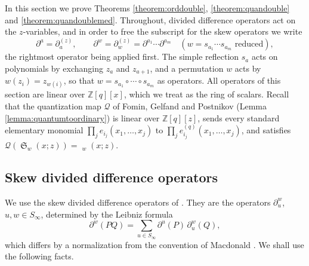 \documentclass{amsart}
\theoremstyle{definition}
\theoremstyle{remark}
\numberwithin{equation}{section}
\DeclareMathOperator{\sch}{\mathfrak{S}}
\DeclareMathOperator{\qsch}{\widetilde{\mathfrak{S}}}
\begin{document}
In this section we prove Theorems \ref{theorem:orddouble}, \ref{theorem:quandouble} and \ref{theorem:quandoublemed}. Throughout, divided difference operators act on the $z$-variables, and in order to free the subscript for the skew operators we write
$$\partial^a=\partial^{(z)}_a,\qquad \partial^w=\partial^{(z)}_w=\partial^{a_1}\cdots\partial^{a_m}\quad(w=s_{a_1}\cdots s_{a_m}\text{ reduced}),$$
the rightmost operator being applied first. The simple reflection $s_a$ acts on polynomials by exchanging $z_a$ and $z_{a+1}$, and a permutation $w$ acts by $w(z_i)=z_{w(i)}$, so that $w=s_{a_1}\circ\cdots\circ s_{a_m}$ as operators. All operators of this section are linear over $\mathbb Z[q][x]$, which we treat as the ring of scalars. Recall that the quantization map $\mathcal Q$ of Fomin, Gelfand and Postnikov (Lemma \ref{lemma:quantumtoordinary}) is linear over $\mathbb Z[q][z]$, sends every standard elementary monomial $\prod_je_{i_j}(x_1,\ldots,x_j)$ to $\prod_je^{(q)}_{i_j}(x_1,\ldots,x_j)$, and satisfies $\mathcal Q(\sch_w(x;z))=\qsch_w(x;z)$.

\subsection{Skew divided difference operators}

We use the skew divided difference operators of \cite{samuelleibniz,samuelmolev}. They are the operators $\partial^w_u$, $u,w\in S_\infty$, determined by the Leibniz formula
\begin{equation}\label{eq:leibniz2}
\partial^w(PQ)=\sum_{u\in S_\infty}\partial^u(P)\,\partial^w_u(Q),
\end{equation}
which differs by a normalization from the convention of Macdonald \cite{notes}. We shall use the following facts.
\end{document}
